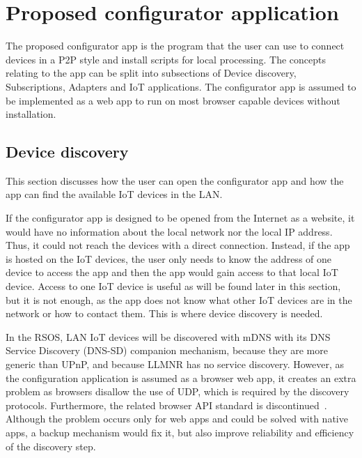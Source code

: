 


\section{Proposed configurator application}



The proposed configurator app is the program that the user can use to connect devices in a P2P style and install scripts for local processing. The concepts relating to the app can be split into subsections of Device discovery, Subscriptions, Adapters and IoT applications. The configurator app is assumed to be implemented as a web app to run on most browser capable devices without installation.


\subsection{Device discovery}
\label{section:discovery}

This section discusses how the user can open the configurator app and how the app can find the available IoT devices in the LAN.

If the configurator app is designed to be opened from the Internet as a website, it would have no information about the local network nor the local IP address. Thus, it could not reach the devices with a direct connection. Instead, if the app is hosted on the IoT devices, the user only needs to know the address of one device to access the app and then the app would gain access to that local IoT device. Access to one IoT device is useful as will be found later in this section, but it is not enough, as the app does not know what other IoT devices are in the network or how to contact them. This is where device discovery is needed.

In the RSOS, LAN IoT devices will be discovered with mDNS with its DNS Service Discovery (DNS-SD) companion mechanism, because they are more generic than UPnP, and because LLMNR has no service discovery. However, as the configuration application is assumed as a browser web app, it creates an extra problem as browsers disallow the use of UDP, which is required by the discovery protocols. Furthermore, the related browser API standard is discontinued~\cite{W3C_Network_Service_Discovery}. Although the problem occurs only for web apps and could be solved with native apps, a backup mechanism would fix it, but also improve reliability and efficiency of the discovery step.

